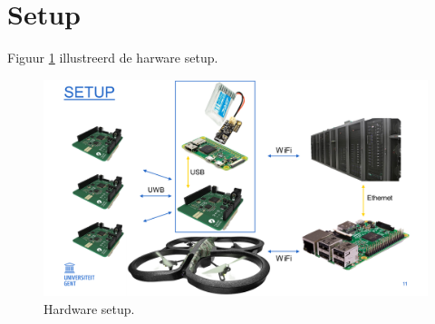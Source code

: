 \section{Setup} \label{sec:setup_hardware}
Figuur \ref{fig:setup_hardware} illustreerd de harware setup.
\begin{figure}[p]
	\centering
	\includegraphics[width=\textwidth]{Setup}
	\caption[Hardware setup]{Hardware setup.}
	\label{fig:setup_hardware}
\end{figure}